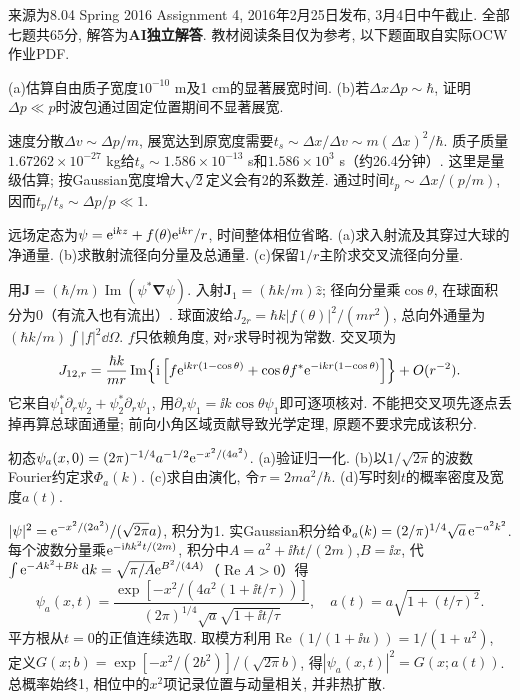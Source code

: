 来源为8.04 Spring 2016 Assignment 4, 2016年2月25日发布, 3月4日中午截止. 全部七题共65分, 解答为\textbf{AI独立解答}. 教材阅读条目仅为参考, 以下题面取自实际OCW作业PDF.
\begin{exercise}
(a)估算自由质子宽度$10^{-10}$ m及1 cm的显著展宽时间. (b)若$\Delta x\Delta p\sim\hbar$, 证明$\Delta p\ll p$时波包通过固定位置期间不显著展宽.
\end{exercise}
\begin{solution}
速度分散$\Delta v\sim\Delta p/m$, 展宽达到原宽度需要$t_s\sim\Delta x/\Delta v\sim m(\Delta x)^2/\hbar$. 质子质量$1.67262\times10^{-27}$ kg给$t_s\sim1.586\times10^{-13}$ s和$1.586\times10^3$ s（约26.4分钟）. 这里是量级估算; 按Gaussian宽度增大$\sqrt2$定义会有2的系数差. 通过时间$t_p\sim\Delta x/(p/m)$, 因而$t_p/t_s\sim\Delta p/p\ll1$.
\end{solution}
\begin{exercise}
远场定态为$\psi=\mathrm e^{\mathrm i kz}+f(\theta)\mathrm e^{\mathrm i kr}/r$, 时间整体相位省略. (a)求入射流及其穿过大球的净通量. (b)求散射流径向分量及总通量. (c)保留$1/r$主阶求交叉流径向分量.
\end{exercise}
\begin{solution}
用$\boldsymbol J=(\hbar/m)\operatorname{Im}(\psi^*\boldsymbol\nabla\psi)$. 入射$\boldsymbol J_1=(\hbar k/m)\hat z$; 径向分量乘$\cos\theta$, 在球面积分为0（有流入也有流出）. 球面波给$J_{2r}=\hbar k|f(\theta)|^2/(mr^2)$, 总向外通量为$(\hbar k/m)\int|f|^2\dd\Omega$. $f$只依赖角度, 对$r$求导时视为常数. 交叉项为
\[
J_{12,r}=\frac{\hbar k}{mr}\operatorname{Im}\!\left\{\mathrm i\left[f\mathrm e^{\mathrm i kr(1-\cos\theta)}+\cos\theta f^*\mathrm e^{-\mathrm i kr(1-\cos\theta)}\right]\right\}+O(r^{-2}).
\]
它来自$\psi_1^*\partial_r\psi_2+\psi_2^*\partial_r\psi_1$, 用$\partial_r\psi_1=\ii k\cos\theta\psi_1$即可逐项核对. 不能把交叉项先逐点丢掉再算总球面通量; 前向小角区域贡献导致光学定理, 原题不要求完成该积分.
\end{solution}
\begin{exercise}
初态$\psi_a(x,0)=(2\pi)^{-1/4}a^{-1/2}\mathrm e^{-x^2/(4a^2)}$. (a)验证归一化. (b)以$1/\sqrt{2\pi}$的波数Fourier约定求$\Phi_a(k)$. (c)求自由演化, 令$\tau=2ma^2/\hbar$. (d)写时刻$t$的概率密度及宽度$a(t)$.
\end{exercise}
\begin{solution}
$|\psi|^2=\mathrm e^{-x^2/(2a^2)}/(\sqrt{2\pi}a)$, 积分为1. 实Gaussian积分给$\Phi_a(k)=(2/\pi)^{1/4}\sqrt a\,\mathrm e^{-a^2k^2}$. 每个波数分量乘$\mathrm e^{-\mathrm i\hbar k^2t/(2m)}$, 积分中$A=a^2+\ii\hbar t/(2m)$,$B=\ii x$, 代$\int\mathrm e^{-Ak^2+Bk}\,\mathrm d k=\sqrt{\pi/A}\mathrm e^{B^2/(4A)}$（$\operatorname{Re}A>0$）得
\[
\psi_a(x,t)=\frac{\exp[-x^2/(4a^2(1+\ii t/\tau))]}{(2\pi)^{1/4}\sqrt a\sqrt{1+\ii t/\tau}},\quad
a(t)=a\sqrt{1+(t/\tau)^2}.
\]
平方根从$t=0$的正值连续选取. 取模方利用$\operatorname{Re}(1/(1+\ii u))=1/(1+u^2)$, 定义$G(x;b)=\exp[-x^2/(2b^2)]/(\sqrt{2\pi}b)$, 得$|\psi_a(x,t)|^2=G(x;a(t))$. 总概率始终1, 相位中的$x^2$项记录位置与动量相关, 并非热扩散.
\end{solution}
